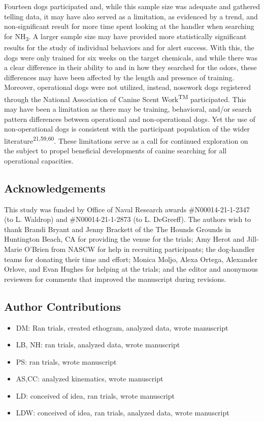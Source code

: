 \documentclass[
]{article}
\providecommand{\tightlist}{%
  \setlength{\itemsep}{0pt}\setlength{\parskip}{0pt}}
\begin{document}
Fourteen dogs participated and, while this sample size was adequate and gathered telling data, it may have also served as a limitation, as evidenced by a trend, and non-significant result for more time spent looking at the handler when searching for NH\textsubscript{3}. A larger sample size may have provided more statistically significant results for the study of individual behaviors and for alert success. With this, the dogs were only trained for six weeks on the target chemicals, and while there was a clear difference in their ability to and in how they searched for the odors, these differences may have been affected by the length and presence of training. Moreover, operational dogs were not utilized, instead, nosework dogs registered through the National Association of Canine Scent Work\textsuperscript{TM} participated. This may have been a limitation as there may be training, behavioral, and/or search pattern differences between operational and non-operational dogs. Yet the use of non-operational dogs is consistent with the participant population of the wider literature\textsuperscript{21,59,60}. These limitations serve as a call for continued exploration on the subject to propel beneficial developments of canine searching for all operational capacities.

\hypertarget{acknowledgements}{%
\subsection{Acknowledgements}\label{acknowledgements}}

This study was funded by Office of Naval Research awards \#N00014-21-1-2347 (to L. Waldrop) and \#N00014-21-1-2873 (to L. DeGreeff). The authors wish to thank Brandi Bryant and Jenny Brackett of the The Hounds Grounds in Huntington Beach, CA for providing the venue for the trials; Amy Herot and Jill-Marie O'Brien from NASCW for help in recruiting participants; the dog-handler teams for donating their time and effort; Monica Moljo, Alexa Ortega, Alexander Orlove, and Evan Hughes for helping at the trials; and the editor and anonymous reviewers for comments that improved the manuscript during revisions.

\hypertarget{author-contributions}{%
\subsection{Author Contributions}\label{author-contributions}}

\begin{itemize}
\tightlist
\item
  DM: Ran trials, created ethogram, analyzed data, wrote manuscript
\item
  LB, NH: ran trials, analyzed data, wrote manuscript
\item
  PS: ran trials, wrote manuscript
\item
  AS,CC: analyzed kinematics, wrote manuscript
\item
  LD: conceived of idea, ran trials, wrote manuscript
\item
  LDW: conceived of idea, ran trials, analyzed data, wrote manuscript
\end{itemize}
\end{document}
